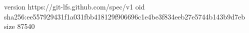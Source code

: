 version https://git-lfs.github.com/spec/v1
oid sha256:ee557929431f1a031fbb418129f906696c1e4be3f834eeb27e5744b143b9d7eb
size 87540
